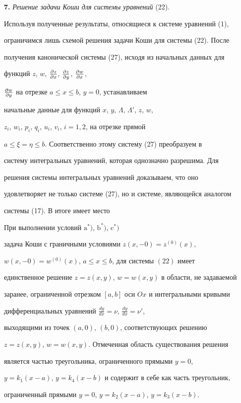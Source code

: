  


{\bf 7.} {\it Решение задачи Коши для системы уравнений} (22). 


Используя полученные результаты, относящиеся к системе уравнений (1), 


ограничимся лишь схемой решения задачи Коши для системы (22). После 


получения канонической системы (27), исходя из начальных данных для 


функций $z$, $w$, $\frac{\partial z}{\partial x}$, $\frac{\partial z}{\partial y}$, $\frac{\partial w}{\partial x}$, 


$\frac{\partial w}{\partial y}$ на отрезке $a\le x\le b$, $y=0$, устанавливаем 


начальные данные для функций $x$, $y$, $\Lambda$, $\Lambda'$, $z$, $w$, 


$z_i$, $w_i$, $p_i$, $q_i$, $u_i$, $v_i$, $i=1,2$, на отрезке прямой 


$a\le\xi=\eta\le b$. Соответственно этому систему (27) преобразуем в 


систему интегральных уравнений, которая однозначно разрешима. Для 


решения системы интегральных уравнений доказываем, что оно 


удовлетворяет не только системе (27), но и системе, являющейся аналогом 


системы (17). В итоге имеет место


 


\begin{thm} 


При выполнении условий $\mathrm a^*)$, $\mathrm b^*)$, $\mathrm c^*)$ 


задача Коши с граничными условиями $z(x,-0)=z^{(0)}(x)$, 


$w(x,-0)=w^{(0)}(x)$, $a\le x\le b$, для системы $(22)$ имеет 


единственное решение $z=z(x,y)$, $w=w(x,y)$ в области, не задаваемой 


заранее, ограниченной отрезком $[a,b]$ оси $Ox$ и интегральными кривыми 


дифференциальных уравнений $\frac{dy}{dx}=\nu$, $\frac{dy}{dx}=\nu'$, 


выходящими из точек $(a,0)$, $(b,0)$, соответствующих решению 


$z=z(x,y)$, $w=w(x,y)$. Отмеченная область существования решения 


является частью треугольника, ограниченного прямыми $y=0$, 


$y=k_1(x-a)$, $y=k_4(x-b)$ и содержит в себе как часть треугольник, 


ограниченный прямыми $y=0$, $y=k_2(x-a)$, $y=k_3(x-b)$. 


\end{thm} 


